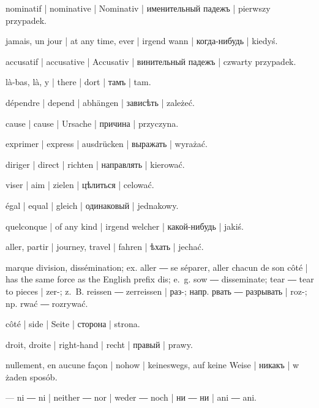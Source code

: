 \begin{ekzvocab}{1em}
 nominatif | nominative | Nominativ | именительный падежъ | pierwszy przypadek.

 jamais, un jour | at any time, ever | irgend wann | когда-нибудь | kiedyś.

 accusatif | accusative | Accusativ | винительный падежъ | czwarty przypadek.

 là-bas, là, y | there | dort | тамъ | tam.

 dépendre | depend | abhängen | зависѣть | zależeć.

 cause | cause | Ursache | причина | przyczyna.

 exprimer | express | ausdrücken | выражать | wyrażać.

 diriger | direct | richten | направлять | kierować.

 viser | aim | zielen | цѣлиться | celować.

 égal | equal | gleich | одинаковый | jednakowy.

 quelconque | of any kind | irgend welcher | какой-нибудь | jakiś.

 aller, partir | journey, travel | fahren | ѣхать | jechać.

 marque division, dissémination; ex.  aller ―  se séparer, aller chacun de son côté | has the same force as the English prefix dis; e.~g.  sow ―  disseminate;  tear ―  tear to pieces | zer-; z.~B.  reissen ―  zerreissen | раз-; напр.  рвать ―  разрывать | roz-; np.  rwać ―  rozrywać.

 côté | side | Seite | сторона | strona.

 droit, droite | right-hand | recht | правый | prawy.

 nullement, en aucune façon | nohow | keineswegs, auf keine Weise | никакъ | w żaden sposób.

 ---  ni ― ni | neither ― nor | weder ― noch | ни ― ни | ani ― ani.

\end{ekzvocab}



